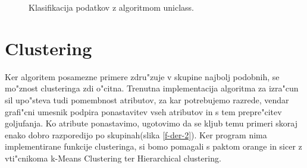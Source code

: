 \documentclass[a4paper]{article}
\begin{document}
	\begin{figure}[H]
	\begin{center}
	\end{center}
	\caption{Klasifikacija podatkov z algoritmom uniclass.}
	\label{f-der-1}
	\end{figure}

\section{Clustering}
	Ker algoritem posamezne primere zdru"zuje v skupine najbolj podobnih, se mo"znost clusteringa zdi o"citna. Trenutna implementacija algoritma za izra"cun sil upo"steva tudi pomembnost atributov, za kar potrebujemo razrede, vendar grafi"cni umesnik podpira ponastavitev vseh atributov in s tem prepre"citev goljufanja. Ko atribute ponastavimo, ugotovimo da se kljub temu primeri skoraj enako dobro razporedijo po skupinah(slika \ref{f-der-2}). Ker program nima implementirane funkcije clusteringa, si bomo pomagali s paktom orange in sicer z vti"cnikoma k-Means Clustering ter Hierarchical clustering. 
	
\end{document}
